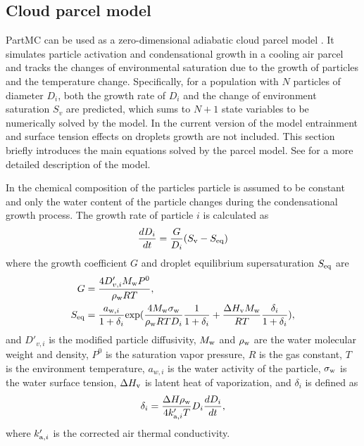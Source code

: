 \documentclass[edeposit,fullpage]{uiucthesis2009}
\begin{document}
\subsection{Cloud parcel model}
\label{section:cloud-parcel-model}
PartMC can be used as a zero-dimensional adiabatic cloud parcel model
\citep{Ching2012}. It simulates particle activation and condensational
growth in a cooling air parcel and tracks the changes of environmental
saturation due to the growth of particles and the temperature
change. Specifically, for a population with $N$ particles of diameter
$D_i$, both the growth rate of $D_i$ and the change of environment
saturation $S_v$ are predicted, which sums to $N + 1$ state variables
to be numerically solved by the model. In the current version of the
model entrainment and surface tension effects on droplets growth are
not included. This section briefly introduces the main equations
solved by the parcel model. See \citet{ching2012impacts} for a more
detailed description of the model.

In \citet{Ching2012} the chemical composition of the particles
particle is assumed to be constant and only the water content of the
particle changes during the condensational growth process. The growth
rate of particle $i$ is calculated as
\begin{equation}
\centering
\frac{dD_i}{dt} = \frac{G}{D_i}(S_{\rm v}-S_{\rm eq})
\label{eq:cloud-parcel} 
\end{equation}
where the growth coefficient $G$ and droplet equilibrium supersaturation $S_{\rm eq}$ are
\begin{equation}
\centering
\begin{aligned}
 G & = \frac{4D'_{v,i}M_{\rm w}P^0}{\rho_{\rm w}RT}  ,\\
 S_{\rm eq} & = \frac{a_{{\rm w},i}}{1+\delta_i}{\rm exp}(\frac{4M_{\rm w}\sigma_{\rm w}}{\rho_{\rm w}RTD_i}\frac{1}{1+\delta_i} + \frac{\Delta H_{\rm v}M_{\rm w}}{RT}\frac{\delta_i}{1+\delta_i}),
\end{aligned}
\end{equation}
and $D'_{v,i}$ is the modified particle diffusivity, $M_{\rm w}$ and $\rho_{\rm w }$ are the water molecular weight and density, $P^0$ is the saturation vapor pressure, $R$ is the gas constant, $T$ is the environment temperature, $a_{w,i}$ is the water activity of the particle, $\sigma_{\rm w}$ is the water surface tension, $\Delta H_{\rm v}$ is latent heat of vaporization, and $\delta_i$ is defined as 
\begin{equation}
    \delta_i = \frac{\Delta H_{\rm }\rho_{\rm w}}{4k'_{{\rm a},i}T}D_i\frac{dD_i}{dt},
\end{equation}
where $k'_{{\rm a},i}$ is the corrected air thermal conductivity. 
\end{document}
